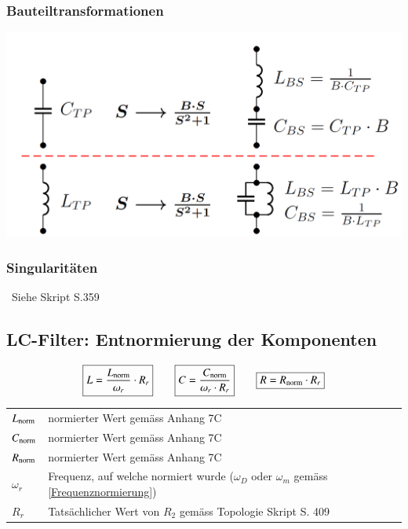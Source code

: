 \begin{minipage}[t]{0.48\columnwidth}
    \subsubsection{Bauteiltransformationen}
    \includegraphics[width=\columnwidth]{images/bauteiltransformation_TP_BS.png}
\end{minipage}
\hfill
\begin{minipage}[t]{0.48\columnwidth}
    \subsubsection{Singularitäten}

    \textrightarrow\ Siehe Skript S.359
\end{minipage}


\subsection{LC-Filter: Entnormierung der Komponenten}
\label{Entnormierung Komponenten}

$$ \boxed{ L = \frac{L_{\rm norm}}{\omega_r} \cdot R_r}
\qquad \boxed{ C = \frac{C_{\rm norm}}{\omega_r \cdot R_r }}
\qquad \boxed{ R = R_{\rm norm} \cdot R_r } $$

\begin{center}
    \begin{tabular}{ll}
        $L_{\rm norm}$  & normierter Wert gemäss Anhang 7C \\
        $C_{\rm norm}$  & normierter Wert gemäss Anhang 7C \\
        $R_{\rm norm}$  & normierter Wert gemäss Anhang 7C \\
        $\omega_r$  & Frequenz, auf welche normiert wurde ($\omega_D$ oder $\omega_m$ gemäss \ref{Frequenznormierung}) \\
        $R_r$       & Tatsächlicher Wert von $R_2$ gemäss Topologie Skript S. 409
    \end{tabular}
\end{center}
    
